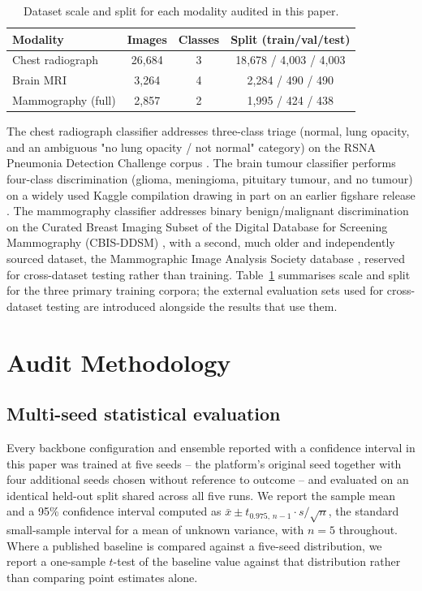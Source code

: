 \documentclass[conference]{IEEEtran}
\begin{document}
\begin{table}[t]
\centering
\caption{Dataset scale and split for each modality audited in this paper.}
\label{tab:datasets}
\begin{tabular}{lccc}
\toprule
Modality & Images & Classes & Split (train/val/test) \\
\midrule
Chest radiograph & 26{,}684 & 3 & 18{,}678 / 4{,}003 / 4{,}003 \\
Brain MRI & 3{,}264 & 4 & 2{,}284 / 490 / 490 \\
Mammography (full) & 2{,}857 & 2 & 1{,}995 / 424 / 438 \\
\bottomrule
\end{tabular}
\end{table}

The chest radiograph classifier addresses three-class triage (normal, lung opacity, and an ambiguous "no lung opacity / not normal" category) on the RSNA Pneumonia Detection Challenge corpus \cite{rsna2019}. The brain tumour classifier performs four-class discrimination (glioma, meningioma, pituitary tumour, and no tumour) on a widely used Kaggle compilation drawing in part on an earlier figshare release \cite{cheng2015}. The mammography classifier addresses binary benign/malignant discrimination on the Curated Breast Imaging Subset of the Digital Database for Screening Mammography (CBIS-DDSM) \cite{lee2017}, with a second, much older and independently sourced dataset, the Mammographic Image Analysis Society database \cite{suckling1994}, reserved for cross-dataset testing rather than training. Table~\ref{tab:datasets} summarises scale and split for the three primary training corpora; the external evaluation sets used for cross-dataset testing are introduced alongside the results that use them.

\section{Audit Methodology}

\subsection{Multi-seed statistical evaluation}
Every backbone configuration and ensemble reported with a confidence interval in this paper was trained at five seeds -- the platform's original seed together with four additional seeds chosen without reference to outcome -- and evaluated on an identical held-out split shared across all five runs. We report the sample mean and a 95\% confidence interval computed as $\bar{x} \pm t_{0.975,\,n-1}\cdot s/\sqrt{n}$, the standard small-sample interval for a mean of unknown variance, with $n=5$ throughout. Where a published baseline is compared against a five-seed distribution, we report a one-sample $t$-test of the baseline value against that distribution rather than comparing point estimates alone.
\end{document}
